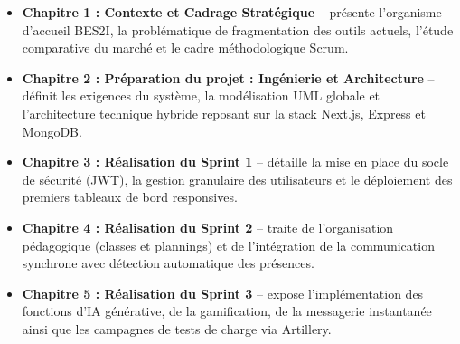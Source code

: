 \begin{itemize}
    \item \textbf{Chapitre 1 : Contexte et Cadrage Stratégique} -- présente l'organisme d'accueil BES2I, la problématique de fragmentation des outils actuels, l'étude comparative du marché et le cadre méthodologique Scrum.
    \item \textbf{Chapitre 2 : Préparation du projet : Ingénierie et Architecture} -- définit les exigences du système, la modélisation UML globale et l'architecture technique hybride reposant sur la stack Next.js, Express et MongoDB.
    \item \textbf{Chapitre 3 : Réalisation du Sprint 1} -- détaille la mise en place du socle de sécurité (JWT), la gestion granulaire des utilisateurs et le déploiement des premiers tableaux de bord responsives.
    \item \textbf{Chapitre 4 : Réalisation du Sprint 2} -- traite de l'organisation pédagogique (classes et plannings) et de l'intégration de la communication synchrone avec détection automatique des présences.
    \item \textbf{Chapitre 5 : Réalisation du Sprint 3} -- expose l'implémentation des fonctions d'IA générative, de la gamification, de la messagerie instantanée ainsi que les campagnes de tests de charge via Artillery.
\end{itemize}
